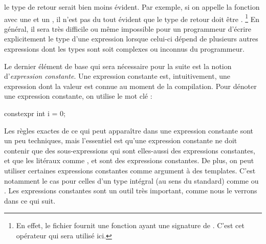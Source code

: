 le type de retour serait bien moins évident. Par exemple, si on appelle la
fonction  avec une  et un , il
n'est pas du tout évident que le type de retour doit être .
\footnote{
    En effet, le fichier  fournit une fonction 
    ayant une signature de . C'est
    cet opérateur qui sera utilisé ici.
}
En général, il sera très difficile ou même impossible pour un programmeur
d'écrire explicitement le type d'une expression lorsque celui-ci dépend de
plusieurs autres expressions dont les types sont soit complexes ou inconnus
du programmeur.

Le dernier élément de base qui sera nécessaire pour la suite est la notion
d'\textit{expression constante}. Une expression constante est, intuitivement,
une expression dont la valeur est connue au moment de la compilation. Pour
dénoter une expression constante, on utilise le mot clé :
\begin{cpp}
    constexpr int i = 0;
\end{cpp}

Les règles exactes de ce qui peut apparaître dans une expression constante
sont un peu techniques, mais l'essentiel est qu'une expression constante ne
doit contenir que des sous-expressions qui sont elles-aussi des expressions
constantes, et que les litéraux comme ,  et 
sont des expressions constantes. De plus, on peut utiliser certaines
expressions constantes comme argument à des templates. C'est notamment le
cas pour celles d'un type intégral (au sens du standard) comme 
ou . Les expressions constantes sont un outil très important,
comme nous le verrons dans ce qui suit.


